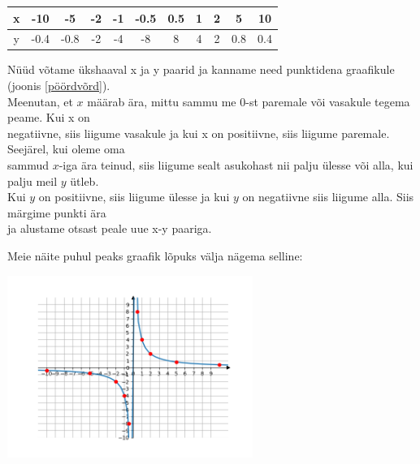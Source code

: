 \begin{center}
{{{\begin{flushleft}
\vspace{2mm}
\hspace{5mm}
\begin{tabular}{c|c|c|c|c|c|c|c|c|c|c}
     x & -10 & -5 & -2 & -1 & -0.5 & 0.5 & 1 & 2 & 5 & 10 \\
     \hline
     y & -0.4 & -0.8 & -2 & -4 & -8 & 8 & 4 & 2 & 0.8 & 0.4
\end{tabular}

\vspace{2mm}
\hspace{5mm}
Nüüd võtame ükshaaval x ja y paarid ja kanname need punktidena graafikule (joonis \ref{pöördvõrd}).\\
\hspace{5mm} Meenutan, et $x$ määrab ära, mittu sammu me $0$-st paremale või vasakule tegema peame. Kui x on\\ \hspace{5mm} negatiivne, siis liigume vasakule ja kui x on positiivne, siis liigume paremale. Seejärel, kui oleme oma\\ \hspace{5mm} sammud $x$-iga ära teinud, siis liigume sealt asukohast nii palju ülesse või alla, kui palju meil $y$ ütleb.\\ \hspace{5mm} Kui $y$ on positiivne, siis liigume ülesse ja kui $y$ on negatiivne siis liigume alla. Siis märgime punkti ära\\ \hspace{5mm} ja alustame otsast peale uue x-y paariga.

\vspace{2mm}
\hspace{5mm} Meie näite puhul peaks graafik lõpuks välja nägema selline:

\begin{center}
    \includegraphics[width=8cm]{pöördvõrdeline.png}
    \label{pöördvõrd}
\end{center}

\end{flushleft} 
}}}
\end{center}


